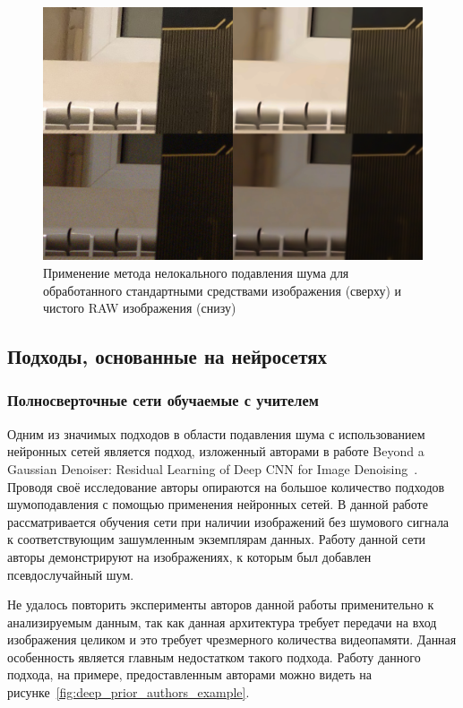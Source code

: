 \begin{figure}[h]
	\centering
	\includegraphics[width=\textwidth]{img/nlmdenoising_comparison}
	\caption{Применение метода нелокального подавления шума для обработанного стандартными средствами изображения (сверху) и чистого RAW изображения (снизу)}
	\label{fig:nlmdenoising_comparison}
\end{figure}

\subsection{Подходы, основанные на нейросетях}

\subsubsection{Полносверточные сети обучаемые с учителем}

Одним из значимых подходов в области подавления шума с использованием нейронных сетей является подход, изложенный авторами в работе Beyond a Gaussian Denoiser: Residual Learning of Deep CNN for Image Denoising~\autocite{DeepPrior}. Проводя своё исследование авторы опираются на большое количество подходов шумоподавления с помощью применения нейронных сетей. В данной работе рассматривается обучения сети при наличии изображений без шумового сигнала к соответствующим зашумленным экземплярам данных. Работу данной сети авторы демонстрируют на изображениях, к которым был добавлен псевдослучайный шум.

Не удалось повторить эксперименты авторов данной работы применительно к анализируемым данным, так как данная архитектура требует передачи на вход изображения целиком и это требует чрезмерного количества видеопамяти. Данная особенность является главным недостатком такого подхода. Работу данного подхода, на примере, предоставленным авторами можно видеть на рисунке~\ref{fig:deep_prior_authors_example}.

